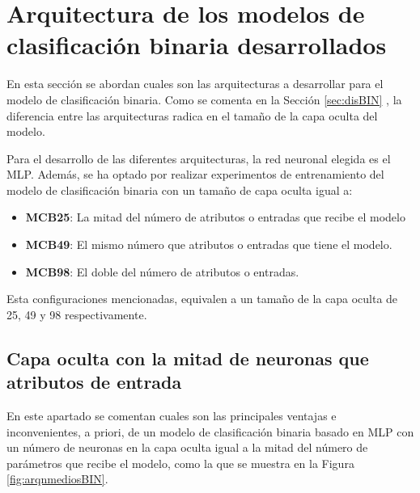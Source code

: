 \section{Arquitectura de los modelos de clasificación binaria desarrollados}
En esta sección se abordan cuales son las arquitecturas a desarrollar para el modelo de clasificación binaria. Como se comenta en la Sección \ref{sec:disBIN} , la diferencia entre las arquitecturas radica en el tamaño de la capa oculta del modelo.

Para el desarrollo de las diferentes arquitecturas, la red neuronal elegida es el MLP. Además, se ha optado por realizar experimentos de entrenamiento del modelo de clasificación binaria con un tamaño de capa oculta igual a:
\begin{itemize}

	\item \textbf{MCB25}: La mitad del número de atributos o entradas que recibe el modelo
	\item \textbf{MCB49}: El mismo número que atributos o entradas que tiene el modelo.
	\item \textbf{MCB98}: El doble del número de atributos o entradas. 

\end{itemize}

Esta configuraciones mencionadas, equivalen a un tamaño de la capa oculta de 25, 49 y 98 respectivamente. 



\subsection{Capa oculta con la mitad de neuronas que atributos de entrada}\label{sec:VIBIN25}
En este apartado se comentan cuales son las principales ventajas e inconvenientes, a priori, de un modelo de clasificación binaria basado en MLP con un número de neuronas en la capa oculta igual a la mitad del número de parámetros que recibe el modelo, como la que se muestra en la Figura \ref{fig:arqnmediosBIN}.

